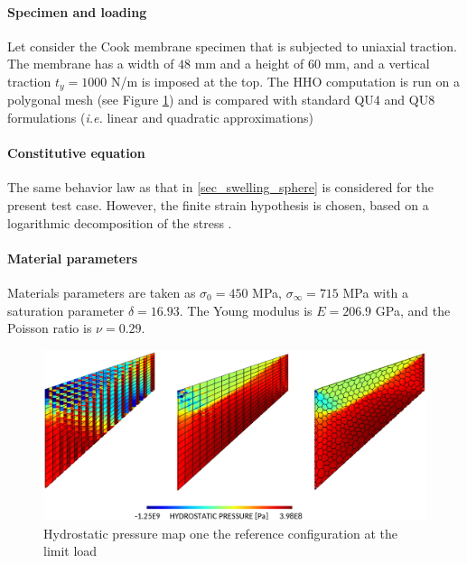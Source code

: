 \paragraph{Specimen and loading}

Let consider the Cook membrane specimen that is subjected to uniaxial
traction. The membrane has a width of $48$ mm and a height of $60$ mm,
and a vertical traction $t_y = 1000$ N/m is imposed at the top. The HHO
computation is run on a polygonal mesh (see Figure \ref{fig_cook}) and
is compared with standard QU4 and QU8 formulations (\textit{i.e.} linear
and quadratic approximations)

\paragraph{Constitutive equation}

The same behavior law as that in \ref{sec_swelling_sphere} is
considered for the present test case. However, the finite strain
hypothesis is chosen, based on a logarithmic decomposition of the stress
\cite{miehe_anisotropic_2002}.

\paragraph{Material parameters}

Materials parameters are taken as
$\sigma_0 = 450$ MPa, $\sigma_{\infty} = 715$ MPa with a saturation parameter $\delta = 16.93$. The Young modulus is $E = 206.9$ GPa, and the Poisson ratio is $\nu = 0.29$.

\begin{figure}[H]
    \centering
    \includegraphics[width=12.cm]{../chapter_01_hho_mechanics/figures/cook_comp.png}
    \caption{Hydrostatic pressure map one the reference configuration at the limit load}
    \label{fig_cook}
\end{figure}

